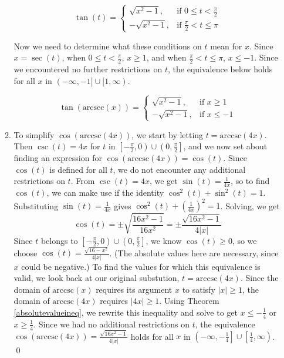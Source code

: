 \documentclass[12pt]{ximera}
\begin{document}
\begin{example}
\begin{enumerate}
\begin{enumerate}
\[ \tan(t) = \left\{ \begin{array}{rr} \sqrt{x^2-1}, & \text{if $0 \leq t < \frac{\pi}{2}$} \\ [5pt] -\sqrt{x^2-1}, & \text{if $\frac{\pi}{2} < t \leq \pi$}  \end{array}\right. \]

Now we need to determine what these conditions on $t$ mean for $x$.  Since $x = \sec(t)$, when $0 \leq t < \frac{\pi}{2}$, $x \geq 1$, and when $\frac{\pi}{2} < t \leq \pi$, $x \leq -1$.  Since we encountered no further restrictions on $t$, the  equivalence below holds for all $x$ in $(-\infty, -1] \cup [1, \infty)$.

\[ \tan(\mbox{arcsec}(x)) = \left\{ \begin{array}{rr} \sqrt{x^2-1}, & \text{if $x \geq 1$} \\[5pt]  -\sqrt{x^2-1}, & \text{if $x \leq -1$}  \end{array}\right. \]



\item  To simplify $\cos(\mbox{arccsc}(4x))$, we start by letting $t = \mbox{arccsc}(4x)$.   Then $\csc(t) = 4x$ for $t$ in $\left[-\frac{\pi}{2}, 0 \right) \cup \left(0, \frac{\pi}{2}\right]$, and we now set about finding an expression for  $\cos(\mbox{arccsc}(4x)) = \cos(t)$.  Since $\cos(t)$ is defined for all $t$, we do not encounter any additional restrictions on $t$.  From $\csc(t) = 4x$, we get $\sin(t) = \frac{1}{4x}$, so to find $\cos(t)$, we can make use if the identity $\cos^{2}(t) + \sin^{2}(t) = 1$.  Substituting $\sin(t) = \frac{1}{4x}$  gives $\cos^{2}(t) + \left(\frac{1}{4x}\right)^2 = 1$.  Solving, we get \[\cos(t) = \pm \sqrt{\frac{16x^2-1}{16x^2}} = \pm \frac{\sqrt{16x^2-1}}{4|x|}\]  Since $t$ belongs to $\left[-\frac{\pi}{2}, 0 \right) \cup \left(0, \frac{\pi}{2}\right]$, we know $\cos(t) \geq 0$, so we choose $\cos(t) = \frac{\sqrt{16-x^2}}{4|x|}$. (The absolute values here are necessary, since $x$ could be negative.)  To find the values for which this equivalence is valid, we look back at our original substution,  $t = \mbox{arccsc}(4x)$.  Since the domain of $\mbox{arccsc}(x)$ requires its argument $x$ to satisfy $|x| \geq 1$, the domain of $\mbox{arccsc}(4x)$ requires $|4x| \geq 1$.  Using Theorem \ref{absolutevalueineq}, we rewrite this inequality and solve to get $x \leq -\frac{1}{4}$ or $x \geq \frac{1}{4}$.  Since we had no additional restrictions on $t$, the equivalence  $\cos(\mbox{arccsc}(4x)) = \frac{\sqrt{16x^2-1}}{4|x|}$  holds for all $x$ in $\left(-\infty, -\frac{1}{4} \right] \cup \left[\frac{1}{4}, \infty \right)$.  \qed

\end{enumerate}

\end{enumerate}

\end{example}
\end{document}
